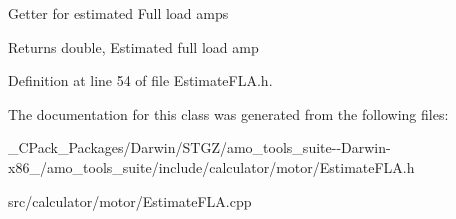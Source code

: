 Getter for estimated Full load amps \begin{DoxyReturn}{Returns}
double, Estimated full load amp 
\end{DoxyReturn}


Definition at line 54 of file Estimate\+F\+L\+A.\+h.



The documentation for this class was generated from the following files\+:\begin{DoxyCompactItemize}
\item 
\+\_\+\+C\+Pack\+\_\+\+Packages/\+Darwin/\+S\+T\+G\+Z/amo\+\_\+tools\+\_\+suite-\/-\/\+Darwin-\/x86\+\_/amo\+\_\+tools\+\_\+suite/include/calculator/motor/Estimate\+F\+L\+A.\+h\item 
src/calculator/motor/Estimate\+F\+L\+A.\+cpp\end{DoxyCompactItemize}
